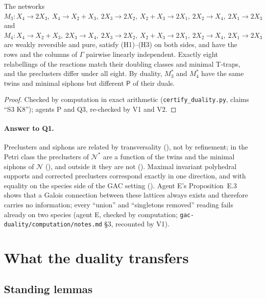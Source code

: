\documentclass[11pt,a4paper]{report}
\newcommand{\Net}{\mathcal{N}}
\newcommand{\Nd}{\mathcal{N}^{*}}
\newcommand{\Pre}{\mathsf{P}}
\begin{document}
\begin{proposition}\label{prop:K8}
The networks \(M_3\colon X_4\to2X_3,\ X_4\to X_2+X_3,\ 2X_3\to2X_2,\ X_2+X_3\to2X_1,\ 2X_2\to X_4,\ 2X_1\to2X_3\) and
\(M_4\colon X_4\to X_2+X_3,\ 2X_3\to X_4,\ 2X_3\to2X_2,\ X_2+X_3\to2X_1,\ 2X_2\to X_4,\ 2X_1\to2X_3\) are weakly
reversible and pure, satisfy (H1)--(H3) on both sides, and have the rows and the columns of \(\Gamma\) pairwise
linearly independent. Exactly eight relabellings of the reactions match their doubling classes and minimal T-traps,
and the preclusters differ under all eight. By duality, \(M_3^*\) and \(M_4^*\) have the same twins and minimal
siphons but different \(\Pre\) of their duals.
\end{proposition}
\begin{proof}
Checked by computation in exact arithmetic (\texttt{certify\_duality.py}, claims ``S3 K8''); agents P and Q3, re-checked
by V1 and V2.
\end{proof}

\paragraph{Answer to Q1.} Preclusters and siphons are related by transversality (),
not by refinement; in the Petri class the preclusters of \(\Nd\) are a function of the twins and the minimal siphons
of \(\Net\) (), and outside it they are not (). Maximal invariant polyhedral supports
and corrected preclusters correspond exactly in one direction, and with equality on the species side of the GAC
setting (). Agent E's Proposition~E.3 shows that a Galois connection between these lattices always
exists and therefore carries no information; every ``union'' and ``singletons removed'' reading fails already on two
species (agent E, checked by computation; \texttt{gac-duality/computation/notes.md} §3, recounted by V1).

\section{What the duality transfers}\label{sec:transfer}

\subsection{Standing lemmas}
\end{document}

